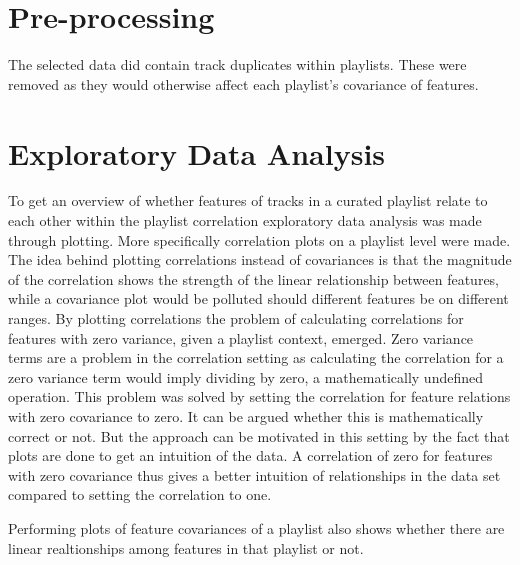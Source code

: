 \documentclass[a4paper,11pt]{kth-mag}
\begin{document}
\section{Pre-processing}
The selected data did contain track duplicates within playlists. These were removed as they would otherwise affect each playlist's covariance of features.

\section{Exploratory Data Analysis}
To get an overview of whether features of tracks in a curated playlist relate to each other within the playlist correlation exploratory data analysis was made through plotting. More specifically correlation plots on a playlist level were made. The idea behind plotting correlations instead of covariances is that the magnitude of the correlation shows the strength of the linear relationship between features, while a covariance plot would be polluted should different features be on different ranges. By plotting correlations the problem of calculating correlations for features with zero variance, given a playlist context, emerged. Zero variance terms are a problem in the correlation setting as calculating the correlation for a zero variance term would imply dividing by zero, a mathematically undefined operation. This problem was solved by setting the correlation for feature relations with zero covariance to zero. It can be argued whether this is mathematically correct or not. But the approach can be motivated in this setting by the fact that plots are done to get an intuition of the data. A correlation of zero for features with zero covariance thus gives a better intuition of relationships in the data set compared to setting the correlation to one.

Performing plots of feature covariances of a playlist also shows whether there are linear realtionships among features in that playlist or not.
\end{document}
